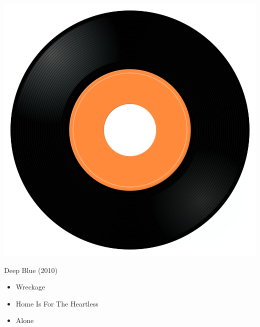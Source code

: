 \begin{minipage}[t]{0.25\textwidth}\vspace{0pt}
	\captionsetup{type=figure}
	\includegraphics[width=\textwidth]{Images/cover.png}
	\caption*{Deep Blue (2010)}
\end{minipage}
\begin{minipage}[t]{0.25\textwidth}\vspace{0pt}
	\begin{itemize}[nosep,leftmargin=1em,labelwidth=*,align=left]
		\setlength{\itemsep}{0pt}
		\item Wreckage
		\item Home Is For The Heartless
		\item Alone
	\end{itemize}
\end{minipage}
